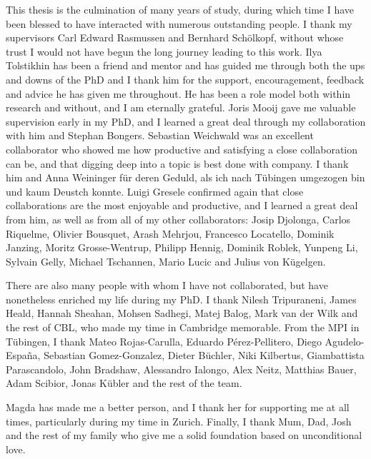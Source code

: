 
\begin{acknowledgements}      


This thesis is the culmination of many years of study, during which time I have been blessed to have interacted with numerous outstanding people.
I thank my supervisors Carl Edward Rasmussen and Bernhard Sch\"olkopf, without whose trust I would not have begun the long journey leading to this work.
Ilya Tolstikhin has been a friend and mentor and has guided me through both the ups and downs of the PhD and I thank him for the support, encouragement, feedback and advice he has given me throughout. He has been a role model both within research and without, and I am eternally grateful.
Joris Mooij gave me valuable supervision early in my PhD, and I learned a great deal through my collaboration with him and Stephan Bongers.
Sebastian Weichwald was an excellent collaborator who showed me how productive and satisfying a close collaboration can be, and that digging deep into a topic is best done with company. I thank him and Anna Weininger f\"ur deren Geduld, als ich nach T\"ubingen umgezogen bin und kaum Deustch konnte.
Luigi Gresele confirmed again that close collaborations are the most enjoyable and productive, and I learned a great deal from him, as well as from all of my other collaborators:
Josip Djolonga, Carlos Riquelme, Olivier Bousquet, Arash Mehrjou, Francesco Locatello, Dominik Janzing, Moritz Grosse-Wentrup, Philipp Hennig, Dominik Roblek, Yunpeng Li, Sylvain Gelly, Michael Tschannen, Mario Lucic and Julius von K\"ugelgen.

There are also many people with whom I have not collaborated, but have nonetheless enriched my life during my PhD.
I thank Nilesh Tripuraneni, James Heald, Hannah Sheahan, Mohsen Sadhegi, Matej Balog, Mark van der Wilk and the rest of CBL, who made my time in Cambridge memorable.
From the MPI in T\"ubingen, I thank Mateo Rojas-Carulla, Eduardo Pérez-Pellitero, Diego Agudelo-Espa\~{n}a, Sebastian Gomez-Gonzalez, Dieter B\"uchler, Niki Kilbertus, Giambattista Parascandolo, John Bradshaw, Alessandro Ialongo, Alex Neitz, Matthias Bauer, Adam Scibior, Jonas K\"ubler and the rest of the team. 

Magda has made me a better person, and I thank her for supporting me at all times, particularly during my time in Zurich.
Finally, I thank Mum, Dad, Josh and the rest of my family who give me a solid foundation based on unconditional love.





\end{acknowledgements}
